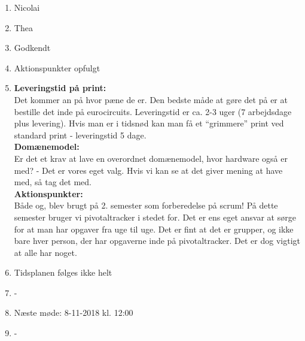 \begin{enumerate}
	\item Nicolai
	\item Thea
	\item Godkendt
	\item Aktionspunkter opfulgt
	\item \textbf{Leveringstid på print:} \\
	Det kommer an på hvor pæne de er. Den bedste måde at gøre det på er at bestille det inde på eurocircuits. 
	Leveringstid er ca. 2-3 uger (7 arbejdsdage plus levering).
	Hvis man er i tidsnød kan man få et “grimmere” print ved standard print - leveringstid 5 dage. \\
	\textbf{Domænemodel: } \\
	Er det et krav at lave en overordnet domænemodel, hvor hardware også er med? -
	Det er vores eget valg. Hvis vi kan se at det giver mening at have med, så tag det med. \\
	\textbf{Aktionspunkter: } \\
	Både og, blev brugt på 2. semester som forberedelse på scrum! På dette semester bruger vi pivotaltracker i stedet for. Det er ens eget ansvar at sørge for at man har opgaver fra uge til uge. 
	Det er fint at det er grupper, og ikke bare hver person, der har opgaverne inde på pivotaltracker. Det er dog vigtigt at alle har noget. 
	\item Tidsplanen følges ikke helt \\
	\item - \\
	\item Næste møde: 8-11-2018 kl. 12:00 \\ 
	\item -
	
\end{enumerate}

\clearpage